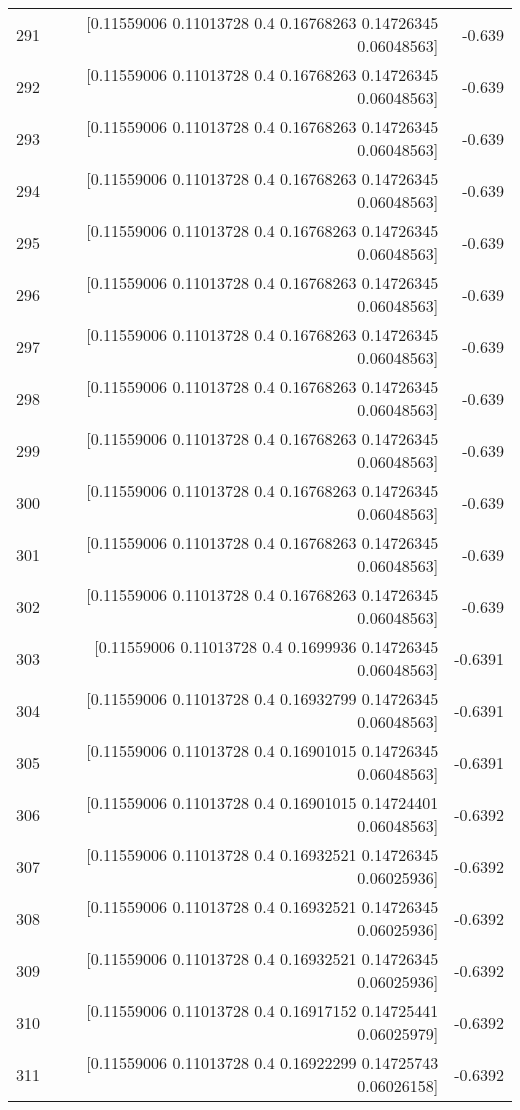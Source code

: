 \begin{longtable}{lrr}
291 & [0.11559006 0.11013728 0.4        0.16768263 0.14726345 0.06048563] & -0.639 \\
292 & [0.11559006 0.11013728 0.4        0.16768263 0.14726345 0.06048563] & -0.639 \\
293 & [0.11559006 0.11013728 0.4        0.16768263 0.14726345 0.06048563] & -0.639 \\
294 & [0.11559006 0.11013728 0.4        0.16768263 0.14726345 0.06048563] & -0.639 \\
295 & [0.11559006 0.11013728 0.4        0.16768263 0.14726345 0.06048563] & -0.639 \\
296 & [0.11559006 0.11013728 0.4        0.16768263 0.14726345 0.06048563] & -0.639 \\
297 & [0.11559006 0.11013728 0.4        0.16768263 0.14726345 0.06048563] & -0.639 \\
298 & [0.11559006 0.11013728 0.4        0.16768263 0.14726345 0.06048563] & -0.639 \\
299 & [0.11559006 0.11013728 0.4        0.16768263 0.14726345 0.06048563] & -0.639 \\
300 & [0.11559006 0.11013728 0.4        0.16768263 0.14726345 0.06048563] & -0.639 \\
301 & [0.11559006 0.11013728 0.4        0.16768263 0.14726345 0.06048563] & -0.639 \\
302 & [0.11559006 0.11013728 0.4        0.16768263 0.14726345 0.06048563] & -0.639 \\
303 & [0.11559006 0.11013728 0.4        0.1699936  0.14726345 0.06048563] & -0.6391 \\
304 & [0.11559006 0.11013728 0.4        0.16932799 0.14726345 0.06048563] & -0.6391 \\
305 & [0.11559006 0.11013728 0.4        0.16901015 0.14726345 0.06048563] & -0.6391 \\
306 & [0.11559006 0.11013728 0.4        0.16901015 0.14724401 0.06048563] & -0.6392 \\
307 & [0.11559006 0.11013728 0.4        0.16932521 0.14726345 0.06025936] & -0.6392 \\
308 & [0.11559006 0.11013728 0.4        0.16932521 0.14726345 0.06025936] & -0.6392 \\
309 & [0.11559006 0.11013728 0.4        0.16932521 0.14726345 0.06025936] & -0.6392 \\
310 & [0.11559006 0.11013728 0.4        0.16917152 0.14725441 0.06025979] & -0.6392 \\
311 & [0.11559006 0.11013728 0.4        0.16922299 0.14725743 0.06026158] & -0.6392 \\

\end{longtable}

